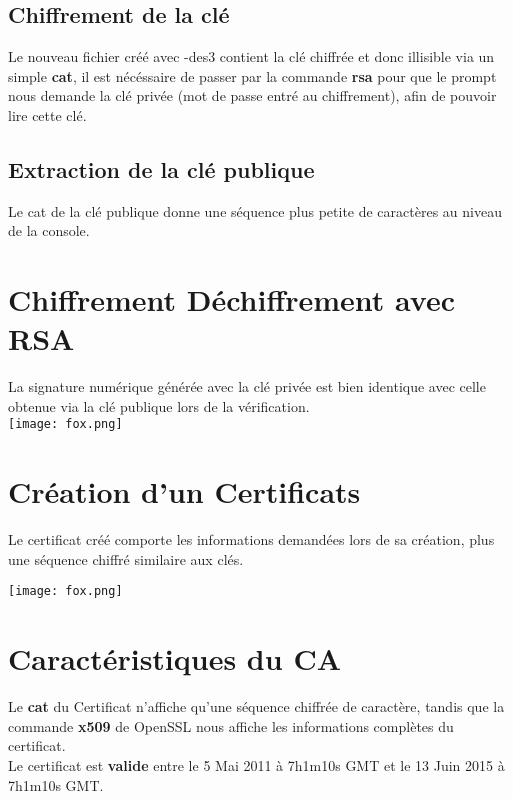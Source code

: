 \documentclass[a4paper,10pt,final,fleqn]{article}
\begin{document}
		\subsection{Chiffrement de la clé}

			Le nouveau fichier créé avec -des3 contient la clé chiffrée et donc illisible via un simple \textbf{cat}, il est nécéssaire de passer par la commande \textbf{rsa} pour que le prompt nous demande la clé privée (mot de passe entré au chiffrement), afin de pouvoir lire cette clé.\\

		\subsection{Extraction de la clé publique}

			Le cat de la clé publique donne une séquence plus petite de caractères au niveau de la console.\\

	\section{Chiffrement Déchiffrement avec RSA}

		La signature numérique générée avec la clé privée est bien identique avec celle obtenue via la clé publique lors de la vérification.\\

		\texttt{[image: fox.png]}

	\section{Création d'un Certificats}

		Le certificat créé comporte les informations demandées lors de sa création, plus une séquence chiffré similaire aux clés.

		\texttt{[image: fox.png]}

	\section{Caractéristiques du CA}

		Le \textbf{cat} du Certificat n'affiche qu'une séquence chiffrée de caractère, tandis que la commande \textbf{x509} de OpenSSL nous affiche les informations complètes du certificat.\\

		Le certificat est \textbf{valide} entre le 5 Mai 2011 à 7h1m10s GMT et le 13 Juin 2015 à 7h1m10s GMT.\\
\end{document}
